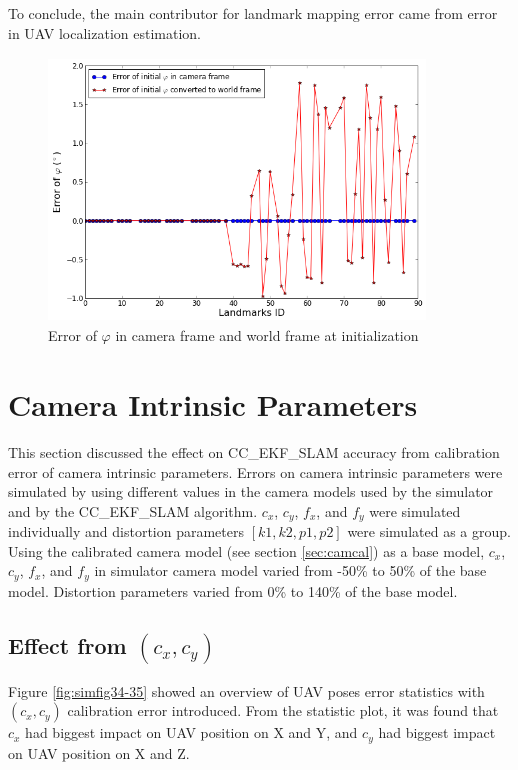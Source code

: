 To conclude, the main contributor for landmark mapping error came
from error in UAV localization estimation.

\begin{figure}[h] %
  \centering
  \includegraphics[width=10cm, height=7cm]{./Figures/SimulationFigures/Figure26.png}
  \caption{Error of $\varphi$ in camera frame and world frame at initialization}
  \label{fig:simfig26}
\end{figure}
\FloatBarrier

\section{Camera Intrinsic Parameters}
This section discussed the effect on CC\_EKF\_SLAM accuracy from
calibration error of camera intrinsic parameters. Errors on camera
intrinsic parameters were simulated by using different values in the
camera models used by the simulator and by the CC\_EKF\_SLAM algorithm.
$c_{x}$, $c_{y}$, $f_{x}$, and $f_{y}$ were simulated individually and
distortion parameters $[k1, k2, p1, p2]$ were simulated as a group.
Using the calibrated camera model (see section \ref{sec:camcal}) as a
base model, $c_{x}$, $c_{y}$, $f_{x}$, and $f_{y}$ in simulator
camera model varied from -50\% to 50\% of the base model. Distortion
parameters varied from 0\% to 140\% of the base model.

\subsection{Effect from $(c_{x}, c_{y})$}
Figure \ref{fig:simfig34-35} showed an overview of UAV poses error
statistics with $(c_{x}, c_{y})$ calibration error introduced. From
the statistic plot, it was found that $c_x$ had biggest impact on UAV
position on X and Y, and $c_y$ had biggest impact on UAV position on X
and Z.

